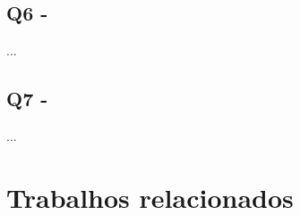 


\subsection{Q6 - \QuestaoSeis} %



...

\subsection{Q7 - \QuestaoSete} %

...

\section{Trabalhos relacionados}

